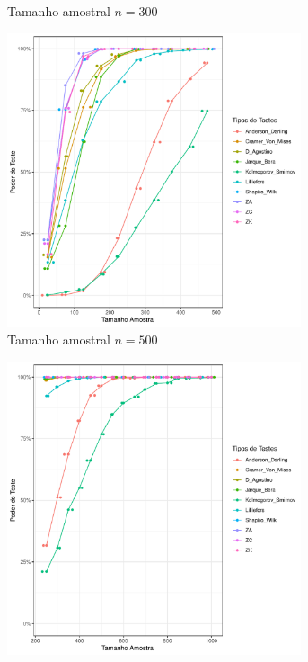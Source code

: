 \documentclass[a4paper,11pt]{article} %
\begin{document}
\begin{figure}[H]
\begin{subfigure}[b]{0.45\textwidth}
        \caption{Tamanho amostral \(n = 300\)}
        \label{fig:cauchy_poder_300}
    \end{subfigure}
    
    \vspace{0.5cm} %
    \begin{subfigure}[b]{0.45\textwidth}
        \centering
        \includegraphics[width=0.95\textwidth]{Distribuição Beta/Poder do Teste/poder_teste_beta_500.pdf}
        \caption{Tamanho amostral \(n = 500\)}
        \label{fig:cauchy_poder_500}
    \end{subfigure}
    \hfill
    \begin{subfigure}[b]{0.45\textwidth}
        \centering
        \includegraphics[width=0.95\textwidth]{Distribuição Beta/Poder do Teste/poder_teste_beta_1000.pdf}

\end{subfigure}
\end{figure}
\end{document}
